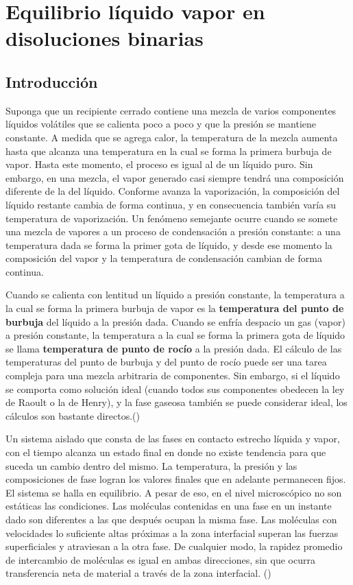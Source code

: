 \documentclass[11pt,letterpaper]{article}
\newcommand{\cita}[1]{(\cite{#1})}
\begin{document}
	
	\section{Equilibrio líquido vapor en disoluciones binarias}
	
	\subsection{Introducción}
	
	Suponga que un recipiente cerrado contiene una mezcla de varios componentes líquidos volátiles que se calienta poco a poco y que la presión se mantiene constante. A medida que se agrega calor, la temperatura de la mezcla aumenta hasta que alcanza una temperatura en la cual se forma la primera burbuja de vapor. Hasta este momento, el proceso es igual al de un líquido puro. Sin embargo, en una mezcla, el vapor generado casi siempre tendrá una composición diferente de la del líquido. Conforme avanza la vaporización, la composición del líquido restante cambia de forma continua, y en consecuencia también varía su temperatura de vaporización. Un fenómeno semejante ocurre cuando se somete una mezcla de vapores a un proceso de condensación a presión constante: a una temperatura dada se forma la primer gota de líquido, y desde ese momento la composición del vapor y la temperatura de condensación cambian de forma continua. 
	
	Cuando se calienta con lentitud un líquido a presión constante, la temperatura a la cual se forma la primera burbuja de vapor es la \textbf{temperatura del punto de burbuja} del líquido a la presión dada. Cuando se enfría despacio un gas (vapor) a presión constante, la temperatura a la cual se forma la primera gota de líquido se llama \textbf{temperatura de punto de rocío} a la presión dada. El cálculo de las temperaturas del punto de burbuja y del punto de rocío puede ser una tarea compleja para una mezcla arbitraria de componentes. Sin embargo, si el líquido se comporta como solución ideal (cuando todos sus componentes obedecen la ley de Raoult o la de Henry), y la fase gaseosa también se puede considerar ideal, los cálculos son bastante directos.\cita{felder}
	
	Un sistema aislado que consta de las fases en contacto estrecho líquida y vapor, con el tiempo alcanza un estado final en donde no existe tendencia para que suceda un cambio dentro del mismo. La temperatura, la presión y las composiciones de fase logran los valores finales que en adelante permanecen fijos. El sistema se halla en equilibrio. A pesar de eso, en el nivel microscópico no son estáticas las condiciones. Las moléculas contenidas en una fase en un instante dado son diferentes a las que después ocupan la misma fase. Las moléculas con velocidades lo suficiente altas próximas a la zona interfacial superan las fuerzas superficiales y atraviesan a la otra fase. De cualquier modo, la rapidez promedio de intercambio de moléculas es igual en ambas direcciones, sin que ocurra transferencia neta de material a través de la zona interfacial. \cita{smith-vanness}
	
\end{document}
